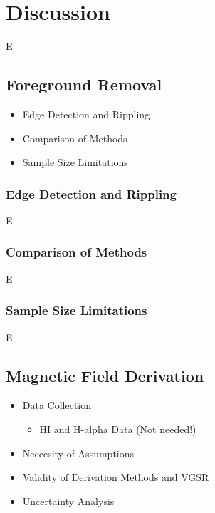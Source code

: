 \chapter{Discussion}
\label{cha:discussion}

E

\section{Foreground Removal}
\label{sec:fr_disc}

\begin{itemize}
    \item Edge Detection and Rippling
    \item Comparison of Methods
    \item Sample Size Limitations
\end{itemize}

\subsection{Edge Detection and Rippling}
\label{ssec:A1}

E

\subsection{Comparison of Methods}
\label{ssec:A2}

E

\subsection{Sample Size Limitations}
\label{ssec:A3}

E

\section{Magnetic Field Derivation}
\label{sec:mag_disc}

\begin{itemize}
    \item Data Collection
    \begin{itemize}
        \item HI and H-alpha Data (Not needed!)
    \end{itemize}
    \item Neccesity of Assumptions
    \item Validity of Derivation Methods and VGSR
    \item Uncertainty Analysis
\end{itemize}

